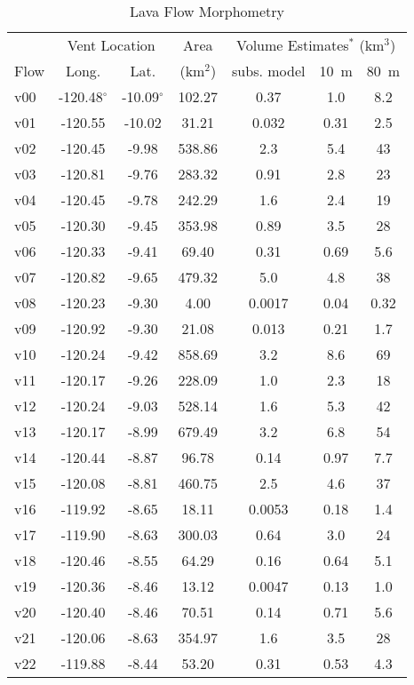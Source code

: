 	\begin{table}[h!]
	\centering
	\caption{Lava Flow Morphometry}
	\begin{tabular}{l c c c c c c}
		\toprule
			 & \multicolumn{2}{c}{Vent Location}  & Area & \multicolumn{3}{c}{Volume Estimates$^*$ (km$^3$)}\\
			Flow & Long. & Lat. & (km$^2$) & subs. model & 10~m & 80~m\\
		\midrule
			v00 & -120.48$^{\circ}$ & -10.09$^{\circ}$ & 102.27 & 0.37 & 1.0 & 8.2\\
			v01 & -120.55 & -10.02 & 31.21 & 0.032 & 0.31 & 2.5\\
			v02 & -120.45 & -9.98 & 538.86 & 2.3 & 5.4 & 43\\
			v03 & -120.81 & -9.76 & 283.32 & 0.91 & 2.8 & 23\\
			v04 & -120.45 & -9.78 & 242.29 & 1.6 & 2.4 & 19\\
			v05 & -120.30 & -9.45 & 353.98 & 0.89 & 3.5 & 28\\
			v06 & -120.33 & -9.41 & 69.40 & 0.31 & 0.69 & 5.6\\
			v07 & -120.82 & -9.65 & 479.32 & 5.0 & 4.8 & 38\\
			v08 & -120.23 & -9.30 & 4.00 & 0.0017 & 0.04 & 0.32\\
			v09 & -120.92 & -9.30 & 21.08 & 0.013 & 0.21 & 1.7\\
			v10 & -120.24 & -9.42 & 858.69 & 3.2 & 8.6 & 69\\
			v11 & -120.17 & -9.26 & 228.09 & 1.0 & 2.3 & 18\\
			v12 & -120.24 & -9.03 & 528.14 & 1.6 & 5.3 & 42\\
			v13 & -120.17 & -8.99 & 679.49 & 3.2 & 6.8 & 54\\
			v14 & -120.44 & -8.87 & 96.78 & 0.14 & 0.97 & 7.7\\
			v15 & -120.08 & -8.81 & 460.75 & 2.5 & 4.6 & 37\\
			v16 & -119.92 & -8.65 & 18.11 & 0.0053 & 0.18 & 1.4\\
			v17 & -119.90 & -8.63 & 300.03 & 0.64 & 3.0 & 24\\
			v18 & -120.46 & -8.55 & 64.29 & 0.16 & 0.64 & 5.1\\
			v19 & -120.36 & -8.46 & 13.12 & 0.0047 & 0.13 & 1.0\\
			v20 & -120.40 & -8.46 & 70.51 & 0.14 & 0.71 & 5.6\\
			v21 & -120.06 & -8.63 & 354.97 & 1.6 & 3.5 & 28\\
			v22 & -119.88 & -8.44 & 53.20 & 0.31 & 0.53 & 4.3\\

\end{tabular}
\end{table}
